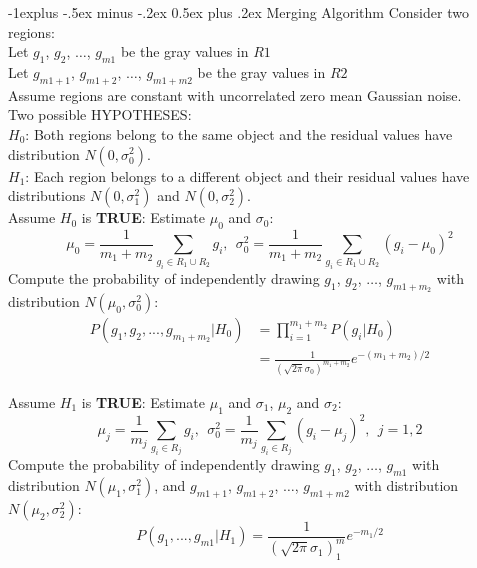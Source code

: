 \documentclass[10pt,landscape]{article}
\makeatletter
\renewcommand{\subsection}{\@startsection{subsection}{2}{0mm}%
                                {-1explus -.5ex minus -.2ex}%
                                {0.5ex plus .2ex}%
                                {\normalfont\normalsize\bfseries}}
\makeatother
\begin{document}
\begin{multicols}{3}
\subsection{Merging Algorithm}
Consider two regions:\\
Let $g_1$, $g_2$, $\dots$, $g_{m1}$ be the gray values in $R1$\\
Let $g_{m1+1}$, $g_{m1+2}$, $\dots$, $g_{m1+m2}$ be the gray values in $R2$\\
Assume regions are constant with uncorrelated zero mean Gaussian noise.\\
Two possible HYPOTHESES:\\
\textbf{$H_0$}: Both regions belong to the same object and the residual values have distribution $N(0, \sigma_0^2)$.\\
\textbf{$H_1$}: Each region belongs to a different object and their residual values have distributions $N(0, \sigma_1^2)$ and $N(0, \sigma_2^2)$.\\
Assume $H_0$ is \textbf{TRUE}: Estimate $\mu_0$ and $\sigma_0$:
\begin{equation*}
    \mu_0 = \frac{1}{m_1+m_2}\sum_{g_i\in R_1\cup R_2}g_i,\ \ \sigma^2_0 = \frac{1}{m_1+m_2}\sum_{g_i\in R_1\cup R_2}(g_i - \mu_0)^2
\end{equation*}
Compute the probability of independently drawing $g_1$, $g_2$, $\dots$, $g_{m1+m_2}$ with distribution $N(\mu_0,\sigma_0^2)$:
\begin{equation*}
\begin{aligned}
P\left ( g_1, g_2,...,g_{m_1+m_2}|H_0 \right )&=\prod^{m_1+m_2}_{i=1}P(g_i|H_0)\\
&=\frac{1}{(\sqrt{2\pi}\sigma_0)^{m_1+m_2}}e^{-(m_1+m_2)/2}
\end{aligned}
\end{equation*}

Assume $H_1$ is \textbf{TRUE}: Estimate $\mu_1$ and $\sigma_1$, $\mu_2$ and $\sigma_2$:
\begin{equation*}
    \mu_j = \frac{1}{m_j}\sum_{g_i\in R_j}g_i,\ \ \sigma^2_0 = \frac{1}{m_j}\sum_{g_i\in R_j}(g_i - \mu_j)^2, \ \ j = 1,2
\end{equation*}
Compute the probability of independently drawing $g_1$, $g_2$, $\dots$, $g_{m1}$ with distribution $N(\mu_1,\sigma_1^2)$, and $g_{m1+1}$, $g_{m1+2}$, $\dots$, $g_{m1+m2}$ with
distribution $N(\mu_2,\sigma_2^2)$:
\begin{equation*}
P\left (g_1,...,g_{m1}|H_1 \right )
=\frac{1}{(\sqrt{2\pi}\sigma_1)^m_1}e^{-m_1/2}
\end{equation*}


\end{multicols}
\end{document}

